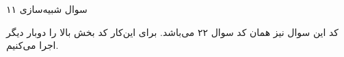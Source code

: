 سوال شبیه‌سازی ۱۱

کد این سوال نیز همان کد سوال ۲۲ می‌باشد.
برای این‌کار کد بخش بالا را دوبار دیگر اجرا می‌کنیم.